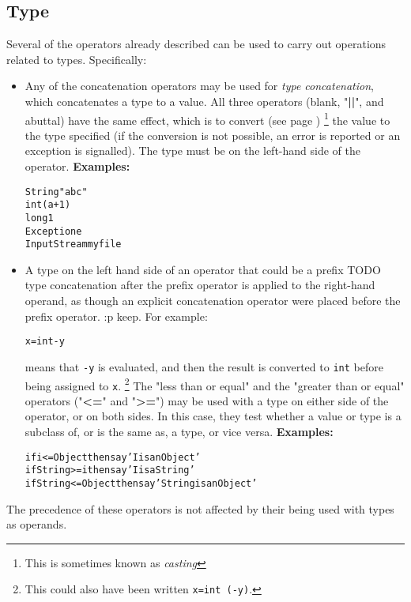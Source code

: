 \subsection{Type}\label{reftypeops}
Several of the operators already described can be used to carry out
operations related to types.  Specifically:
\begin{itemize}
\item Any of the concatenation operators may be used for \emph{type
concatenation}, which concatenates a type to a value.  All three
operators (blank, "\textbf{||}", and abuttal) have the same
effect, which is to  convert (see page \pageref{refconv}) 
\footnote{
This is sometimes known as \emph{casting}
}
the value to the type
specified (if the conversion is not possible, an error is reported or an
exception is signalled).
The type must be on the left-hand side of the operator.
 \textbf{Examples:}
\begin{alltt}
String "abc"
int (a+1)
long 1
Exception e
InputStream myfile
\end{alltt}
\item 
{}
A type on the left hand side of an operator that could be a prefix
TODO
type concatenation after the prefix operator is applied to the
right-hand operand, as though an explicit concatenation operator were
placed before the prefix operator.
:p keep.
For example:
\begin{alltt}
x=int -y
\end{alltt}
means that \texttt{-y} is evaluated, and then the result is
converted to \texttt{int} before being assigned to \texttt{x}.
\footnote{
This could also have been written \texttt{x=int (-y)}.
}
The "less than or equal" and the "greater than or equal"
operators ("\textbf{<=}" and "\textbf{>=}") may be used
with a type on either side of the operator, or on both sides.
In this case, they test whether a value or type is a subclass of, or is
the same as, a type, or vice versa.
 \textbf{Examples:}
\begin{alltt}
if i<=Object then say 'I is an Object'
if String>=i then say 'I is a String'
if String<=Object then say 'String is an Object'
\end{alltt}
\end{itemize}
The precedence of these operators is not affected by their being
used with types as operands.
